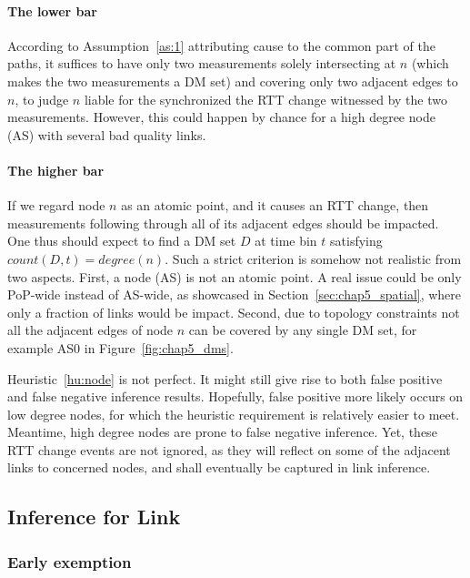 \paragraph{The lower bar} According to Assumption~\ref{as:1} attributing cause to the common part of the paths, it suffices to have only two measurements solely intersecting at $n$ (which makes the two measurements a \ac{DM} set) and covering only two adjacent edges to $n$, to judge $n$ liable for the synchronized the RTT change witnessed by the two measurements. However, this could happen by chance for a high degree node (AS) with several bad quality links.

\paragraph{The higher bar} If we regard node $n$ as an atomic point, and it causes an RTT change, then measurements following through all of its adjacent edges should be impacted. One thus should expect to find a \ac{DM} set $D$ at time bin $t$ satisfying $count(D, t) = degree(n)$. Such a strict criterion is somehow not realistic from two aspects. First, a node (AS) is not an atomic point. A real issue could be only PoP-wide instead of AS-wide, as showcased in Section~\ref{sec:chap5_spatial}, where only a fraction of links would be impact. Second, due to topology constraints not all the adjacent edges of node $n$ can be covered by any single \ac{DM} set, for example AS0 in Figure~\ref{fig:chap5_dms}.

Heuristic~\ref{hu:node} is not perfect. It might still give rise to both false positive and false negative inference results. Hopefully, false positive more likely occurs on low degree nodes, for which the heuristic requirement is relatively easier to meet. Meantime, high degree nodes are prone to false negative inference. Yet, these RTT change events are not ignored, as they will reflect on some of the adjacent links to concerned nodes, and shall eventually be captured in link inference.

\subsection{Inference for Link}

\subsubsection{Early exemption}

